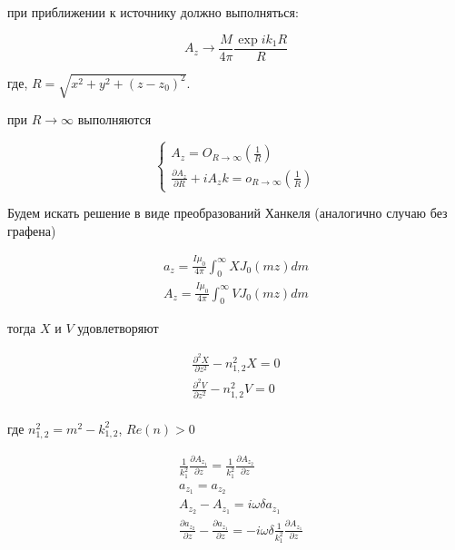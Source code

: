 	при приближении к источнику должно выполняться:
	
	\begin{equation}
		A_z \rightarrow \frac{M}{4 \pi} \frac{\exp{i k_1 R}}{R} 
	\end{equation}
	
	где, $R = \sqrt{x^2 + y^2 + {(z - z_0)} ^ 2}$.
	
	при $R \rightarrow \infty$ выполняются
	
	\begin{equation}
		\begin{cases}
			A_z = O_{R \rightarrow \infty}(\frac{1}{R}) \\
			\frac{\partial A_z}{\partial R} + i A_z k = o_{R \rightarrow \infty}(\frac{1}{R})
		\end{cases}
	\end{equation}
	
	Будем искать решение в виде преобразований Ханкеля (аналогично случаю без графена)
	
	\begin{equation}
		\begin{aligned}
			a_z = \frac{I \mu_0 }{4 \pi} \int_0^{\infty} X J_0(mz)dm \\
			A_z = \frac{I \mu_0 }{4 \pi} \int_0^{\infty} V J_0(mz)dm
		\end{aligned}
	\end{equation}
	
	тогда $X$ и $V$ удовлетворяют
	
	\begin{equation}
		\begin{aligned}
			\frac{\partial^2 X}{\partial z^2} - n_{1, 2}^2 X = 0 \\
			\frac{\partial^2 V}{\partial z^2} - n_{1, 2}^2 V = 0 \\
		\end{aligned}
	\end{equation}
	
	где $n_{1, 2}^2 = m^2 - k_{1, 2}^2$, $Re (n) > 0$
	
	\begin{equation*}
		\tag{50.1}
		\begin{aligned}
			& \frac{1}{k_1^2} \frac{\partial A_{z_1}}{\partial z} = \frac{1}{k_1^2} \frac{\partial A_{z_2}}{\partial z} \\
			&a_{z_1} = a_{z_2} \\
			& A_{z_2} - A_{z_1} = i \omega \delta a_{z_1} \\
			&\frac{\partial a_{z_2}}{\partial z} - \frac{\partial a_{z_1}}{\partial z} = -i \omega \delta \frac{1}{k_1^2} \frac{\partial A_{z_1}}{\partial z} \\ 
		\end{aligned}
	\end{equation*}
	
